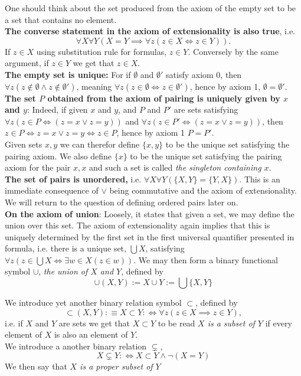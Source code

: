 \begin{remark}
    One should think about the set produced from the axiom of the empty set to be a set that contains no element.\\ \textbf{The converse statement in the axiom of extensionality is also true}, i.e. 
    $$\forall X \forall Y(X=Y\implies \forall z(z\in X\iff z\in Y)).$$ 
    If $z\in X$
    using substitution rule for formulas, $z\in Y$. Conversely by the same argument, if $z\in Y$ we get that $z\in X$.\\
    \textbf{The empty set is unique:} For if $\emptyset$ and $\emptyset'$ satisfy axiom 0, then $\forall z(z\notin \emptyset \wedge z\notin \emptyset')$, meaning $\forall z(z\in \emptyset \iff z\in \emptyset')$, hence by axiom 1, $\emptyset = \emptyset'$.\\
    \textbf{The set $P$ obtained from the axiom of pairing is uniquely given by $x$ and $y$}: Indeed, if given $x$ and $y$, and $P$ and $P'$ are sets satisfying $\forall z(z\in P \iff (z=x\vee z=y))$ and $\forall z(z\in P' \iff (z=x\vee z=y))$, then $z\in P\iff z=x \vee z=y \iff z\in P$, hence by axiom 1 $P=P'$.\\
    Given sets $x,y$ we can therefor define $\{x,y\}$ to be the unique set satisfying the pairing axiom. We also define $\{x\}$ to be the unique set satisfying the pairing axiom for the pair $x,x$ and such a set is called \textit{the singleton containing $x$}.\\
    \textbf{The set of pairs is unordered,} i.e. $\forall X\forall Y(\{X,Y\}=\{Y,X\})$. This is an immediate consequence of $\vee$ being commutative and the axiom of extensionality. We will return to the question of defining ordered pairs later on.\\
    \textbf{On the axiom of union}: Loosely, it states that given a set, we may define the union over this set. The axiom of extensionality again implies that this is uniquely determined by the first set in the first universal quantifier presented in formula, i.e. there is a unique set, $\bigcup X$, satisfying $\forall z(z\in \bigcup X \iff \exists w\in X(z\in w))$. We may then form a binary functional symbol $\cup$, \textit{the union of $X$ and $Y$}, defined by
    $$\cup(X,Y):= X\cup Y := \bigcup \{X,Y\}$$
\end{remark}
\begin{definition}
    We introduce yet another binary relation symbol $\subset$, defined by 
    $$\subset(X,Y):\equiv X \subset Y :\iff \forall z(z\in X \implies z\in Y),$$
    i.e. if $X$ and $Y$ are sets we get that $X\subset Y$ to be read \textit{$X$ is a subset of $Y$} if every element of $X$ is also an element of $Y$.\\
    We introduce a another binary relation $\subsetneq$,
    $$ X\subsetneq Y :\iff X\subset Y \wedge \neg(X=Y)$$
    We then say that \textit{$X$ is a proper subset of $Y$}
\end{definition}
